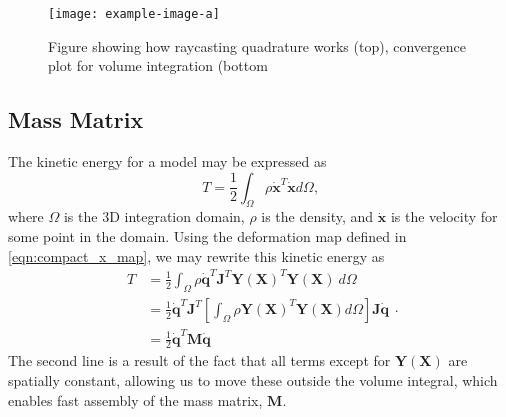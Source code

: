\begin{figure}
    \texttt{[image: example-image-a]}
    \caption{Figure showing how raycasting quadrature works (top), convergence plot for volume integration (bottom}
    \label{fig:raycasting}
\end{figure}

\subsection{Mass Matrix}
The kinetic energy for a model may be expressed as
\begin{equation}
T = \frac{1}{2}\int_{ \Omega} \rho \dot{\mathbf{x}}^T\dot{\mathbf{x}} d\Omega
\text{,}
\end{equation}
where $\Omega$ is the 3D integration domain, $\rho$ is the density, and $\dot{\mathbf{x}}$ is the velocity for some point in the domain. Using the deformation map defined in \ref{eqn:compact_x_map}, we may rewrite this kinetic energy as
\begin{equation}
\begin{split}
T & = \frac{1}{2}\int_{ \Omega} \rho \dot{\mathbf{q}}^T \mathbf{J}^T\mathbf{Y(X)}^T\mathbf{Y(X)}\ d\Omega \\
  & = \frac{1}{2} \dot{\mathbf{q}}^T \mathbf{J}^T \left[ \int_{ \Omega} \rho \mathbf{Y(X)}^T\mathbf{Y(X)} d\Omega \right] \mathbf{J}\dot{\mathbf{q}} \\
  & = \frac{1}{2} \dot{\mathbf{q}}^T \mathbf{M} \dot{\mathbf{q}}
\end{split}
\text{.}
\end{equation}
The second line is a result of the fact that all terms except for $\mathbf{Y(X)}$ are spatially constant, allowing us to move these outside the volume integral, which enables fast assembly of the mass matrix, $\mathbf{M}$.
